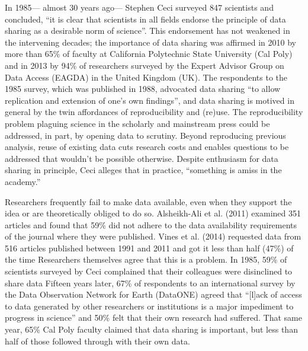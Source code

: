 \documentclass[10pt]{article}
\begin{document}
In 1985--- almost 30 years ago--- Stephen Ceci surveyed 847 scientists and concluded, ``it is clear that scientists in all fields endorse the principle of data sharing as a desirable norm of science''\cite{ceci_scientists_1988}.
This endorsement has not weakened in the intervening decades; the importance of data sharing was affirmed in 2010 by more than 65\% of faculty at California Polytechnic State University (Cal Poly)\cite{scaramozzino_study_2012} and in 2013 by 94\% of researchers surveyed by the Expert Advisor Group on Data Access (EAGDA) in the United Kingdom (UK)\cite{bobrow_establishing_2014}.
The respondents to the 1985 survey, which was published in 1988, advocated data sharing ``to allow replication and extension of one's own findings''\cite{ceci_scientists_1988}, and data sharing is motived in general by the twin affordances of reproducibility and (re)use.
The reproducibility problem plaguing science in the scholarly\cite{ioannidis_why_2005, prinz_believe_2011, mobley_survey_2013} and mainstream\cite{zimmer_rise_2012, _how_2013, editors_trouble_2013} press could be addressed, in part, by opening data to scrutiny\cite{drew_lost_2013, collins_nih_2014}.
Beyond reproducing previous analysis, reuse of existing data cuts research costs\cite{piwowar_data_2011} and enables questions to be addressed that wouldn't be possible otherwise\cite{stewart_meta-analysis_2010, borenstein_introduction_2011}.
Despite enthusiasm for data sharing in principle, Ceci alleges that in practice, ``something is amiss in the academy.''

Researchers frequently fail to make data available, even when they support the idea or are theoretically obliged to do so.
Alsheikh-Ali et al. (2011) examined 351 articles and found that 59\% did not adhere to the data availability requirements of the journal where they were published.
Vines et al. (2014) requested data from 516 articles published between 1991 and 2011 and got it less than half (47\%) of the time\cite{vines_availability_2014}
Researchers themselves agree that this is a problem.
In 1985, 59\% of scientists surveyed by Ceci complained that their colleagues were disinclined to share data\cite{ceci_scientists_1988}
Fifteen years later, 67\% of respondents to an international survey by the Data Observation Network for Earth (DataONE) agreed that ``[l]ack of access to data generated by other researchers or institutions is a major impediment to progress in science'' and 50\% felt that their own research had suffered\cite{tenopir_data_2011}.
That same year, 65\% Cal Poly faculty claimed that data sharing is important, but less than half of those followed through with their own data\cite{scaramozzino_study_2012}.
\end{document}
